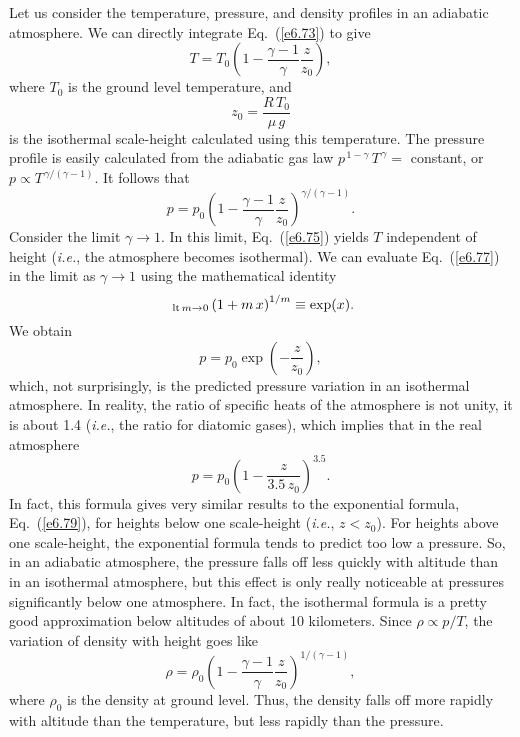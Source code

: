Let us consider the  temperature, pressure, and density profiles in an
adiabatic atmosphere. We can directly integrate Eq.~(\ref{e6.73}) to
give
\begin{equation}
T = T_0 \left(1 - \frac{\gamma -1}{\gamma} \frac{z}{z_0} \right),\label{e6.75}
\end{equation}
where $T_0$ is the ground level temperature, and
\begin{equation}
z_0 = \frac{R \,T_0}{\mu\, g}
\end{equation}
is the isothermal scale-height calculated using this temperature. The
pressure profile is easily calculated from the adiabatic gas law
$p^{\,1-\gamma} \,T^{\,\gamma} =$ constant, or $p \propto T^{\,\gamma/(\gamma -1)}$. It
follows that
\begin{equation} \label{e6.77}
p= p_0 \left(1 - \frac{\gamma -1}{\gamma} \frac{z}{z_0} \right)^{\gamma/(\gamma-1)}.
\end{equation}
Consider the limit $\gamma\rightarrow 1$. In this limit, Eq.~(\ref{e6.75}) yields
$T$ independent of height ({\em i.e.}, the atmosphere becomes  isothermal). We can evaluate
Eq.~(\ref{e6.77}) in the limit 
 as $\gamma\rightarrow 1$ using the mathematical identity
\begin{equation}
~_{ {\rm lt}\, m\rightarrow 0} \left(1 + m\,x\right)^{1/m} \equiv \exp(x).
\end{equation}
We obtain
\begin{equation}
p = p_0\exp\left(-\frac{z}{z_0}\right),\label{e6.79}
\end{equation}
which, not surprisingly, is the predicted pressure variation
in an isothermal atmosphere. In reality,
the ratio of specific heats of the atmosphere is not unity, it is about 1.4
({\em i.e.}, the ratio for diatomic gases), which 
 implies that in the real atmosphere
\begin{equation}
p= p_0 \left(1 - \frac{z}{3.5\,z_0} \right)^{3.5}.
\end{equation}
In fact, this formula gives very similar results to the exponential formula,
Eq.~(\ref{e6.79}), for heights below one scale-height ({\em i.e.}, $z<z_0$). For heights
above one scale-height, the exponential formula tends to predict too low
a pressure. So, in an adiabatic atmosphere, the pressure falls off less quickly
with altitude than in an isothermal atmosphere, but this effect is only really
noticeable at pressures significantly below one atmosphere. In fact, the isothermal
formula is a pretty good approximation below altitudes of about 10 kilometers.
Since $\rho \propto p/T$, the variation of density with height goes like
\begin{equation}
\rho= \rho_0 \left(1 - \frac{\gamma -1}{\gamma} \frac{z}{z_0} \right)^{1/(\gamma-1)},
\end{equation}
where $\rho_0$ is the density at ground level. Thus, the density falls off
more rapidly with altitude than the temperature, but less rapidly than the
pressure. 

